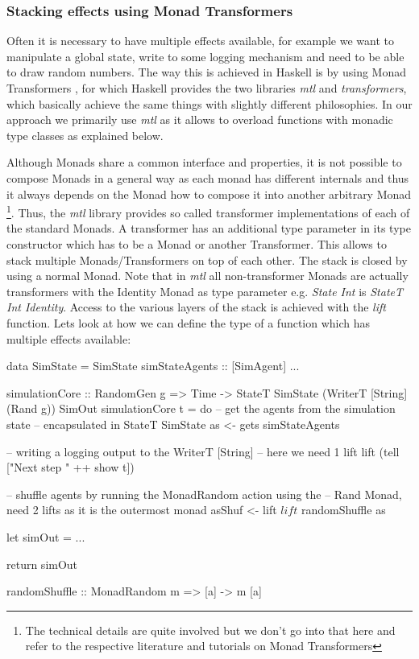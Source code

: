 \subsubsection{Stacking effects using Monad Transformers}
Often it is necessary to have multiple effects available, for example we want to manipulate a global state, write to some logging mechanism and need to be able to draw random numbers. The way this is achieved in Haskell is by using Monad Transformers \cite{jones_functional_1995}, for which Haskell provides the two libraries \textit{mtl} and \textit{transformers}, which basically achieve the same things with slightly different philosophies. In our approach we primarily use \textit{mtl} as it allows to overload functions with monadic type classes as explained below.

\medskip

Although Monads share a common interface and properties, it is not possible to compose Monads in a general way as each monad has different internals and thus it always depends on the Monad how to compose it into another arbitrary Monad \footnote{The technical details are quite involved but we don't go into that here and refer to the respective literature and tutorials on Monad Transformers}. Thus, the \textit{mtl} library provides so called transformer implementations of each of the standard Monads. A transformer has an additional type parameter in its type constructor which has to be a Monad or another Transformer. This allows to stack multiple Monads/Transformers on top of each other. The stack is closed by using a normal Monad. Note that in \textit{mtl} all non-transformer Monads are actually transformers with the Identity Monad as type parameter e.g. \textit{State Int} is \textit{StateT Int Identity}. Access to the various layers of the stack is achieved with the \textit{lift} function. Lets look at how we can define the type of a function which has multiple effects available:

\begin{HaskellCode}
data SimState = SimState 
  { simStateAgents :: [SimAgent]
  ...
  }

simulationCore :: RandomGen g 
               => Time
               -> StateT SimState (WriterT [String] (Rand g)) SimOut
simulationCore t = do
  -- get the agents from the simulation state 
  -- encapsulated in StateT SimState
  as <- gets simStateAgents
  
  -- writing a logging output to the WriterT [String]
  -- here we need 1 lift 
  lift (tell ["Next step " ++ show t])
  
  -- shuffle agents by running the MonadRandom action using the
  -- Rand Monad, need 2 lifts as it is the outermost monad
  asShuf <- lift $ lift $ randomShuffle as
  
  let simOut = ...
  
  return simOut
  
randomShuffle :: MonadRandom m => [a] -> m [a]
\end{HaskellCode}

